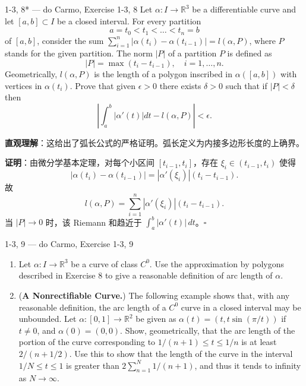 \begin{exercise}{1-3, 8* — do Carmo, Exercise 1-3, 8}
Let $\alpha: I \to \mathbb{R}^3$ be a differentiable curve and let $[a, b] \subset I$ be a closed interval. For every partition
\[
a = t_0 < t_1 < \dots < t_n = b
\]
of $[a, b]$, consider the sum $\sum_{i=1}^n |\alpha(t_i) - \alpha(t_{i-1})| = l(\alpha, P)$, where $P$ stands for the given partition. The norm $|P|$ of a partition $P$ is defined as
\[
|P| = \max(t_i - t_{i-1}), \quad i = 1, \dots, n.
\]
Geometrically, $l(\alpha, P)$ is the length of a polygon inscribed in $\alpha([a, b])$ with vertices in $\alpha(t_i)$. Prove that given $\epsilon > 0$ there exists $\delta > 0$ such that if $|P| < \delta$ then
\[
\left| \int_a^b |\alpha'(t)| dt - l(\alpha, P) \right| < \epsilon.
\]
\end{exercise}

\begin{solution}
\textbf{直观理解}：这给出了弧长公式的严格证明。弧长定义为内接多边形长度的上确界。

\textbf{证明}：由微分学基本定理，对每个小区间 $[t_{i-1}, t_i]$，存在 $\xi_i \in (t_{i-1}, t_i)$ 使得
\[
|\alpha(t_i) - \alpha(t_{i-1})| = |\alpha'(\xi_i)|(t_i - t_{i-1}).
\]
故
\[
l(\alpha, P) = \sum_{i=1}^n |\alpha'(\xi_i)|(t_i - t_{i-1}).
\]
当 $|P| \to 0$ 时，该 Riemann 和趋近于 $\int_a^b |\alpha'(t)|\, dt$。$\square$
\end{solution}

\begin{exercise}{1-3, 9 — do Carmo, Exercise 1-3, 9}
\begin{enumerate}
\item[a.] Let $\alpha: I \to \mathbb{R}^3$ be a curve of class $C^0$. Use the approximation by polygons described in Exercise 8 to give a reasonable definition of arc length of $\alpha$.

\item[b.] (\textbf{A Nonrectifiable Curve.}) The following example shows that, with any reasonable definition, the arc length of a $C^0$ curve in a closed interval may be unbounded. Let $\alpha: [0,1] \to \mathbb{R}^2$ be given as $\alpha(t) = (t, t\sin(\pi/t))$ if $t \neq 0$, and $\alpha(0) = (0,0)$. Show, geometrically, that the arc length of the portion of the curve corresponding to $1/(n+1) \leq t \leq 1/n$ is at least $2/(n + 1/2)$. Use this to show that the length of the curve in the interval $1/N \leq t \leq 1$ is greater than $2\sum_{n=1}^N 1/(n+1)$, and thus it tends to infinity as $N \to \infty$.
\end{enumerate}
\end{exercise}

